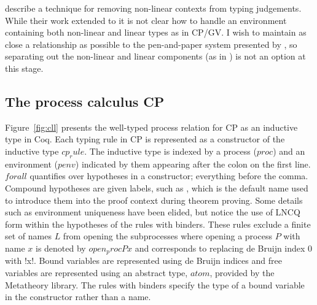 \citeauthor{Park:2014:MMW} describe a technique for removing non-linear
contexts from typing judgements. While their work extended to \fpop it is not
clear how to handle an environment containing both non-linear and linear types
as in CP/GV. I wish to maintain as close a relationship as possible to the
pen-and-paper system presented by \citeauthor{Wadler:2014}, so separating out
the non-linear and linear components (as in \fpop) is not an option at this
stage.

\begin{comment}
\section{Issues}

\begin{itemize}
\item What is required of a Metatheory library for linear type systems?
  Permutation reasoning? Weakening/Contraction for non-linear components?
\item Discuss the different approaches that were taken to maintain close
  correspondence with the paper presentation
\item Make sure to note that the paper leaves details (a lot of the ``cruft'')
  out of the proofs e.g. where weakening is applied in the typing derivations
\item Mention the use of Metatheory and its limitations when mechanising
  linear type systems like GV/CP
\end{itemize}
\end{comment}

\subsection{The process calculus CP}\label{sec:cp}




Figure~\ref{fig:cll} presents the well-typed process relation for CP as an
inductive type in Coq. Each typing rule in CP is represented as a constructor
of the inductive type \coqe$cp_rule$. The inductive type is indexed by a
process (\coqe$proc$) and an environment (\coqe$penv$) indicated by them
appearing after the colon on the first line. \coqe$forall$ quantifies over
hypotheses in a constructor; everything before the comma. Compound hypotheses
are given labels, such as , which is the default name used to
introduce them into the proof context during theorem proving. Some details
such as environment uniqueness have been elided, but notice the use of LNCQ
form within the hypotheses of the rules with binders. These rules exclude a
finite set of names \coqe$L$ from opening the subprocesses where opening a
process \coqe$P$ with name \coqe$x$ is denoted by \coqe$open_proc P x$ and
corresponds to replacing de Bruijn index 0 with \coqe!x!. Bound variables are
represented using de Bruijn indices and free variables are represented using
an abstract type, \coqe$atom$, provided by the Metatheory library. The rules
with binders specify the type of a bound variable in the constructor rather
than a name.

